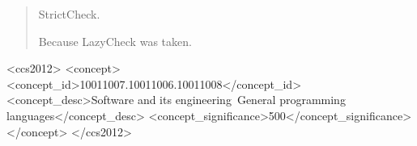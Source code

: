 \documentclass[acmsmall,review]{acmart}\settopmatter{}
\begin{document}


\begin{abstract}
StrictCheck.

Because LazyCheck was taken.
\end{abstract}


\begin{CCSXML}
<ccs2012>
<concept>
<concept_id>10011007.10011006.10011008</concept_id>
<concept_desc>Software and its engineering~General programming languages</concept_desc>
<concept_significance>500</concept_significance>
</concept>
</ccs2012>
\end{CCSXML}




\maketitle
\end{document}
